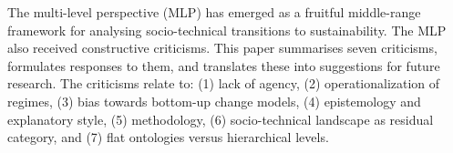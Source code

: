 The multi-level perspective (MLP) has emerged as a fruitful middle-range framework for analysing socio-technical transitions to sustainability. The MLP also received constructive criticisms. This paper summarises seven criticisms, formulates responses to them, and translates these into suggestions for future research. The criticisms relate to: (1) lack of agency, (2) operationalization of regimes, (3) bias towards bottom-up change models, (4) epistemology and explanatory style, (5) methodology, (6) socio-technical landscape as residual category, and (7) flat ontologies versus hierarchical levels.